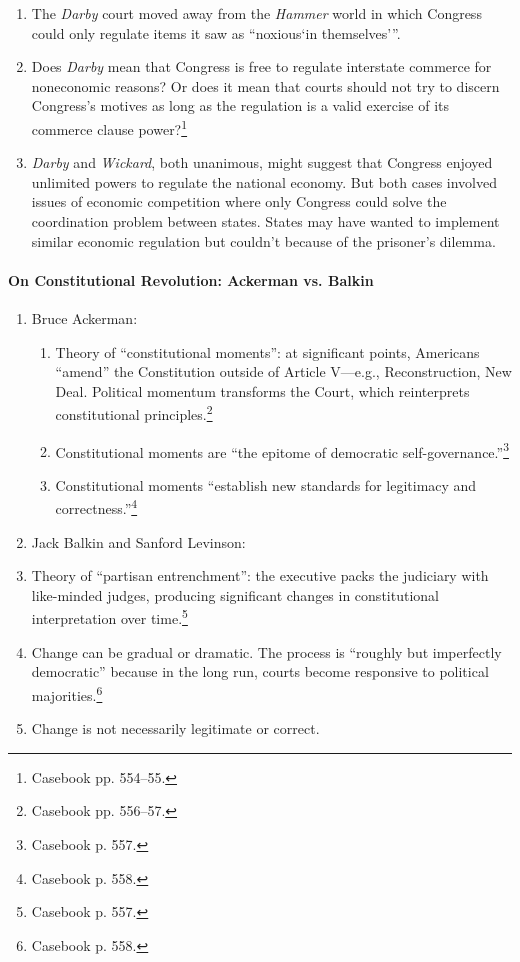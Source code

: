 \begin{enumerate}
    \item The \emph{Darby} court moved away from the \emph{Hammer} world in 
    which Congress could only regulate items it saw as 
    \enquote{noxious\enquote{in themselves}}.
    \item Does \emph{Darby} mean that Congress is free to regulate interstate 
    commerce for noneconomic reasons? Or does it mean that courts should 
    not try to discern Congress's motives as long as the regulation is a valid 
    exercise of its commerce clause power?\footnote{Casebook pp. 554--55.}
    \item \emph{Darby} and \emph{Wickard}, both unanimous, might suggest that 
    Congress enjoyed unlimited powers to regulate the national economy. But 
    both cases involved issues of economic competition where only Congress 
    could solve the coordination problem between states. States may have 
    wanted to implement similar economic regulation but couldn't because of 
    the prisoner's dilemma.
\end{enumerate}

\paragraph{On Constitutional Revolution: Ackerman vs. Balkin}

\begin{enumerate}
    \item Bruce Ackerman:
    \begin{enumerate}
        \item Theory of ``constitutional moments'': at significant points, 
        Americans ``amend'' the Constitution outside of Article V---e.g., 
        Reconstruction, New Deal. Political momentum transforms the Court, 
        which reinterprets constitutional principles.\footnote{Casebook pp. 
        556--57.}
        \item Constitutional moments are ``the epitome of democratic 
        self-governance.''\footnote{Casebook p. 557.}
        \item Constitutional moments ``establish new standards for legitimacy 
        and correctness.''\footnote{Casebook p. 558.}
    \end{enumerate}
    \item Jack Balkin and Sanford Levinson:
        \item Theory of ``partisan entrenchment'': the executive packs the 
        judiciary with like-minded judges, producing significant changes in 
        constitutional interpretation over time.\footnote{Casebook p. 557.}
        \item Change can be gradual or dramatic. The process is ``roughly but 
        imperfectly democratic'' because in the long run, courts become 
        responsive to political majorities.\footnote{Casebook p. 558.}
        \item Change is not necessarily legitimate or correct.
\end{enumerate}



